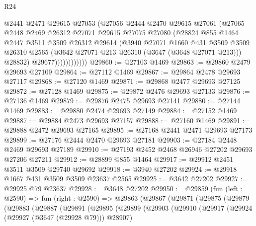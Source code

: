\begin{lexlean}{R24}
\begin{coremodule}
                      @2441
                      @2471
                      @29615
                      @27053
                      (@27056
                        @2444
                        @2470
                        @29615
                        @27061
                        (@27065
                          @2448
                          @2469
                          @26312
                          @27071
                          @29615
                          @27075
                          @27080
                          (@28824
                            @855
                            @1464
                            @2447
                            @3511
                            @3509
                            @26312
                            @29614
                            (@3940
                              @27071
                              @1660
                              @431
                              @3509
                              @3509
                              @26310
                              @2565
                              (@3642 @27071 @213 @26310 (@3647 (@3648 @27071 @213)))
                              @28832)
                            @29677))))))))))))
@29860 := @27103 @1469
@29863 := @29860 @2479 @29693 @27109
@29864 := @27112 @1469
@29867 := @29864 @2478 @29693 @27117
@29868 := @27120 @1469
@29871 := @29868 @2477 @29693 @27125
@29872 := @27128 @1469
@29875 := @29872 @2476 @29693 @27133
@29876 := @27136 @1469
@29879 := @29876 @2475 @29693 @27141
@29880 := @27144 @1469
@29883 := @29880 @2474 @29693 @27149
@29884 := @27152 @1469
@29887 := @29884 @2473 @29693 @27157
@29888 := @27160 @1469
@29891 := @29888 @2472 @29693 @27165
@29895 := @27168 @2441 @2471 @29693 @27173
@29899 := @27176 @2444 @2470 @29693 @27181
@29903 := @27184 @2448 @2469 @29693 @27189
@29910 := @27193 @2452 @2468 @26946 @27202 @29693 @27206 @27211
@29912 := @28899 @855 @1464
@29917 := @29912 @2451 @3511 @3509 @29740 @29692
@29918 := @3940 @27202
@29924 := @29918 @1667 @431 @3509 @3509 @23637 @2565
@29925 := @3642 @27202
@29927 := @29925 @79 @23637
@29928 := @3648 @27202
@29950 := @29859
    (fun (left : @2590) =>
    fun (right : @2590) =>
    @29863
      (@29867
        (@29871
          (@29875
            (@29879
              (@29883
                (@29887
                  (@29891
                    (@29895
                      (@29899
                        (@29903
                          (@29910
                            (@29917
                              (@29924 (@29927 (@3647 (@29928 @79))) @28907)

\end{coremodule}
\end{lexlean}
